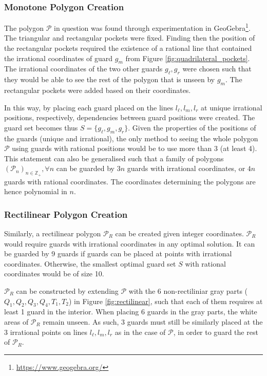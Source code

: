 \subsubsection{Monotone Polygon Creation}
The polygon $\mathcal P$ in question  was found through experimentation in GeoGebra\footnote{\url{https://www.geogebra.org/}}. The triangular and rectangular pockets were fixed. Finding then the position of the rectangular pockets required the existence of a rational line that contained the irrational coordinates of guard $g_m$ from Figure \ref{fig:quadrilateral_pockets}. The irrational coordinates of the two other guards $g_\ell, g_r$ were chosen such that they would be able to see the rest of the polygon that is unseen by $g_m$. The rectangular pockets were added based on their coordinates.

In this way, by placing each guard placed on the lines $l_\ell, l_m, l_r$ at unique irrational positions, respectively, dependencies between guard positions were created. The guard set becomes thus $S = \{g_\ell, g_m, g_r\}$.  Given the properties of the positions of the guards (unique and irrational), the only method to seeing the whole polygon $\mathcal P$ using guards with rational positions would be to use more than 3 (at least 4). This statement can also be generalised such that a family of polygons $(\mathcal{P}_n)_{n \in \mathbb{Z}_+}, \forall n$ can be guarded by $3n$ guards with irrational coordinates, or $4n$ guards with rational coordinates. The coordinates determining the polygons are hence polynomial in $n$.

\subsubsection{Rectilinear Polygon Creation}
Similarly, a rectilinear polygon $\mathcal P_R$ can be created given integer coordinates. $\mathcal P_R$ would require guards with irrational coordinates in any optimal solution. It can be guarded by 9 guards if guards can be placed at points with irrational coordinates. Otherwise, the smallest optimal guard set $S$ with rational coordinates would be of size 10.

$\mathcal P_R$ can be constructed by extending $\mathcal P$ with the 6 non-rectiliniar gray parts ($Q_1, Q_2, Q_3, Q_4, T_1, T_2$) in Figure \ref{fig:rectilinear}, such that each of them requires at least 1 guard in the interior. When placing 6 guards in the gray parts, the white areas of $\mathcal P_R$ remain unseen. As such, 3 guards must still be similarly placed at the 3 irrational points on lines $l_\ell, l_m, l_r$ as in the case of $\mathcal P$, in order to guard the rest of $\mathcal P_R$.


